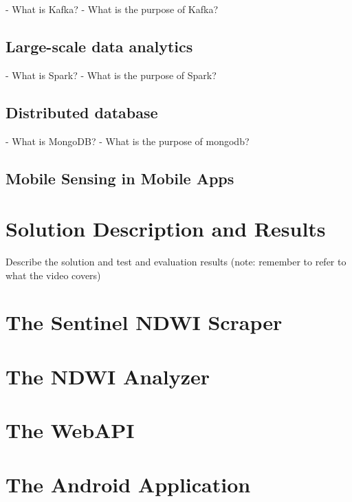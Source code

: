 - What is Kafka?
- What is the purpose of Kafka?

\subsection{Large-scale data analytics}

- What is Spark?
- What is the purpose of Spark?

\subsection{Distributed database}

- What is MongoDB?
- What is the purpose of mongodb?

\subsection{Mobile Sensing in Mobile Apps}

\section{Solution Description and Results} 
Describe the solution and test and evaluation results (note: remember to refer to what the video covers)

\section{The Sentinel NDWI Scraper}

\section{The NDWI Analyzer}

\section{The WebAPI}

\section{The Android Application}